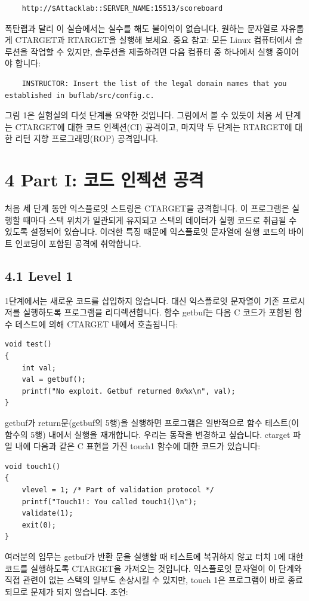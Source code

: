 \documentclass[10pt]{article}
\begin{document}
\begin{verbatim}
    http://$Attacklab::SERVER_NAME:15513/scoreboard
\end{verbatim}
\noindent
폭탄랩과 달리 이 실습에서는 실수를 해도 불이익이 없습니다. 원하는 문자열로 자유롭게 CTARGET과 RTARGET을 실행해 보세요.
\noindent
중요 참고: 모든 Linux 컴퓨터에서 솔루션을 작업할 수 있지만, 솔루션을 제출하려면 다음 컴퓨터 중 하나에서 실행 중이어야 합니다:

\begin{verbatim}
    INSTRUCTOR: Insert the list of the legal domain names that you established in buflab/src/config.c.
\end{verbatim}
\noindent
그림 1은 실험실의 다섯 단계를 요약한 것입니다. 그림에서 볼 수 있듯이 처음 세 단계는 CTARGET에 대한 코드 인젝션(CI) 공격이고, 마지막 두 단계는 RTARGET에 대한 리턴 지향 프로그래밍(ROP) 공격입니다.

\section*{4 Part I: 코드 인젝션 공격}
처음 세 단계 동안 익스플로잇 스트링은 CTARGET을 공격합니다. 이 프로그램은 실행할 때마다 스택 위치가 일관되게 유지되고 스택의 데이터가 실행 코드로 취급될 수 있도록 설정되어 있습니다. 이러한 특징 때문에 익스플로잇 문자열에 실행 코드의 바이트 인코딩이 포함된 공격에 취약합니다.

\subsection*{4.1 Level 1}
1단계에서는 새로운 코드를 삽입하지 않습니다. 대신 익스플로잇 문자열이 기존 프로시저를 실행하도록 프로그램을 리디렉션합니다.
\noindent
함수 getbuf는 다음 C 코드가 포함된 함수 테스트에 의해 CTARGET 내에서 호출됩니다:

\begin{verbatim}
void test()
{
    int val;
    val = getbuf();
    printf("No exploit. Getbuf returned 0x%x\n", val);
}
\end{verbatim}
\noindent
getbuf가 return문(getbuf의 5행)을 실행하면 프로그램은 일반적으로 함수 테스트(이 함수의 5행) 내에서 실행을 재개합니다. 우리는 동작을 변경하고 싶습니다. ctarget 파일 내에 다음과 같은 C 표현을 가진 touch1 함수에 대한 코드가 있습니다:

\begin{verbatim}
void touch1()
{
    vlevel = 1; /* Part of validation protocol */
    printf("Touch1!: You called touch1()\n");
    validate(1);
    exit(0);
}
\end{verbatim}
\noindent
여러분의 임무는 getbuf가 반환 문을 실행할 때 테스트에 복귀하지 않고 터치 1에 대한 코드를 실행하도록 CTARGET을 가져오는 것입니다. 익스플로잇 문자열이 이 단계와 직접 관련이 없는 스택의 일부도 손상시킬 수 있지만, touch 1은 프로그램이 바로 종료되므로 문제가 되지 않습니다.
\noindent
조언:
\end{document}
